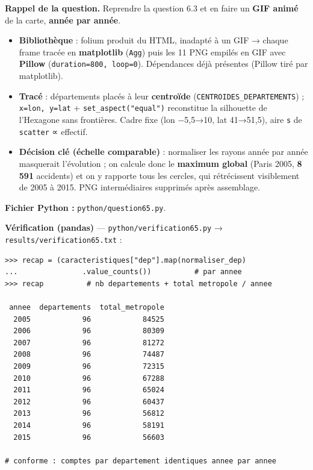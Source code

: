 \documentclass[11pt,a4paper]{article}
\newcommand{\rub}[2]{\textbf{\textcolor{#1}{#2}}}
\begin{document}
\rub{labrappel}{Rappel de la question.} Reprendre la question 6.3 et en faire un \textbf{GIF animé} de la carte, \textbf{année par année}.

\begin{agentbox}
\begin{itemize}
\item \textbf{Bibliothèque} : folium produit du HTML, inadapté à un GIF → chaque frame tracée en \textbf{matplotlib} (\texttt{Agg}) puis les 11 PNG empilés en GIF avec \textbf{Pillow} (\texttt{duration=800, loop=0}). Dépendances déjà présentes (Pillow tiré par matplotlib).
\item \textbf{Tracé} : départements placés à leur \textbf{centroïde} (\texttt{CENTROIDES\_DEPARTEMENTS}) ; \texttt{x=lon, y=lat} + \texttt{set\_aspect("equal")} reconstitue la silhouette de l'Hexagone sans frontières. Cadre fixe (lon −5,5→10, lat 41→51,5), aire \texttt{s} de \texttt{scatter} ∝ effectif.
\item \textbf{Décision clé (échelle comparable)} : normaliser les rayons année par année masquerait l'évolution ; on calcule donc le \textbf{maximum global} (Paris 2005, \textbf{8 591} accidents) et on y rapporte tous les cercles, qui rétrécissent visiblement de 2005 à 2015. PNG intermédiaires supprimés après assemblage.
\end{itemize}
\end{agentbox}

\rub{labfichier}{Fichier Python :} \texttt{python/question65.py}.

\rub{labverif}{Vérification (pandas)} --- \texttt{python/verification65.py} → \texttt{results/verification65.txt} :

\begin{lstlisting}[style=pyblock]
>>> recap = (caracteristiques["dep"].map(normaliser_dep)
...               .value_counts())          # par annee
>>> recap          # nb departements + total metropole / annee

 annee  departements  total_metropole
  2005            96            84525
  2006            96            80309
  2007            96            81272
  2008            96            74487
  2009            96            72315
  2010            96            67288
  2011            96            65024
  2012            96            60437
  2013            96            56812
  2014            96            58191
  2015            96            56603

# conforme : comptes par departement identiques annee par annee
\end{lstlisting}
\end{document}
